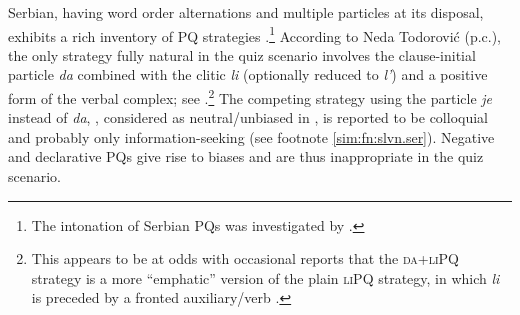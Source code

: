 \documentclass[output=paper,colorlinks,citecolor=brown]{langscibook}
\begin{document}
\ea\label{sim:ex:just-ukr}
\z\z

\ea\label{sim:ex:just-pol}
\z\z

\noindent Serbian, having word order alternations and multiple particles at its disposal, exhibits a rich inventory of PQ strategies \citep{Rakic1984,Todorovic2023}.\footnote{The intonation of Serbian PQs was investigated by \citet{Nakic.Browne1975}.} According to Neda Todorović (p.c.), the only strategy fully natural in the quiz scenario involves the clause-initial particle \textit{da} combined with the clitic \textit{li} (optionally reduced to \textit{l'}) and a positive form of the verbal complex; see .\footnote{This appears to be at odds with occasional reports that the \textsc{da+liPQ} strategy is a more ``emphatic'' version of the plain \textsc{liPQ} strategy, in which \textit{li} is preceded by a fronted auxiliary/verb \citep{Browne1971,Rakic1984}.} The competing strategy using the particle \textit{je} instead of \textit{da}, , considered as neutral/unbiased in \citet{Todorovic2023}, is reported to be colloquial and probably only information-seeking (see footnote \ref{sim:fn:slvn.ser}). Negative and declarative PQs give rise to biases and are thus inappropriate in the quiz scenario. 
\end{document}
